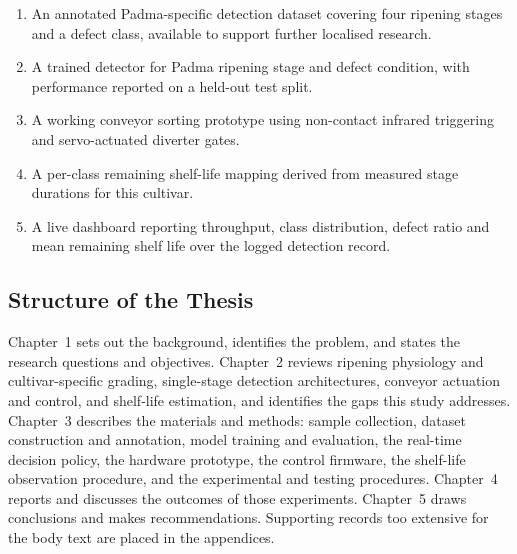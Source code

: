 \begin{enumerate}
    \item An annotated Padma-specific detection dataset covering four ripening stages and a defect class, available to support further localised research.
    \item A trained detector for Padma ripening stage and defect condition, with performance reported on a held-out test split.
    \item A working conveyor sorting prototype using non-contact infrared triggering and servo-actuated diverter gates.
    \item A per-class remaining shelf-life mapping derived from measured stage durations for this cultivar.
    \item A live dashboard reporting throughput, class distribution, defect ratio and mean remaining shelf life over the logged detection record.
\end{enumerate}

\subsection{Structure of the Thesis}
\label{sec:structure}

Chapter~1 sets out the background, identifies the problem, and states the research questions and objectives. Chapter~2 reviews ripening physiology and cultivar-specific grading, single-stage detection architectures, conveyor actuation and control, and shelf-life estimation, and identifies the gaps this study addresses. Chapter~3 describes the materials and methods: sample collection, dataset construction and annotation, model training and evaluation, the real-time decision policy, the hardware prototype, the control firmware, the shelf-life observation procedure, and the experimental and testing procedures. Chapter~4 reports and discusses the outcomes of those experiments. Chapter~5 draws conclusions and makes recommendations. Supporting records too extensive for the body text are placed in the appendices.

\clearpage
